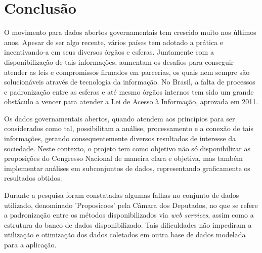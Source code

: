 \documentclass[
	12pt,				%
	openright,			%
	twoside,			%
	a4paper,			%
	english,			%
	french,				%
	spanish,			%
	brazil				%
	]{abntex2}
\begin{document}
\chapter{Conclusão}

O movimento para dados abertos governamentais tem crescido muito nos últimos anos. Apesar de ser algo recente, vários países
tem adotado a prática e incentivando-a em seus diversos órgãos e esferas. Juntamente com a disponibilização de tais informações,
aumentam os desafios para conseguir atender as leis e compromissos firmados em parcerias, os quais nem sempre são solucionáveis
através de tecnologia da informação. No Brasil, a falta de processos e padronização entre as esferas e até mesmo órgãos internos
tem sido um grande obstáculo a vencer para atender a Lei de Acesso à Informação, aprovada em 2011.

Os dados governamentais abertos, quando atendem aos princípios para ser considerados como tal, possibilitam a análise, 
processamento e a conexão de tais informações, gerando consequentemente diversos resultados de interesse da sociedade. 
Neste contexto, o projeto tem como objetivo não só disponibilizar as proposições do Congresso Nacional de maneira clara e 
objetiva, mas também implementar análises em subconjuntos de dados, representando graficamente os resultados obtidos.

Durante a pesquisa foram constatadas algumas falhas no conjunto de dados utilizado, denominado 'Proposicoes' pela 
Câmara dos Deputados, no que se refere a padronização entre os métodos disponibilizados via \emph{web services}, assim
como a estrutura do banco de dados disponibilizado. Tais dificuldades não impediram a utilização e otimização dos dados
coletados em outra base de dados modelada para a aplicação.





%
%
\end{document}
